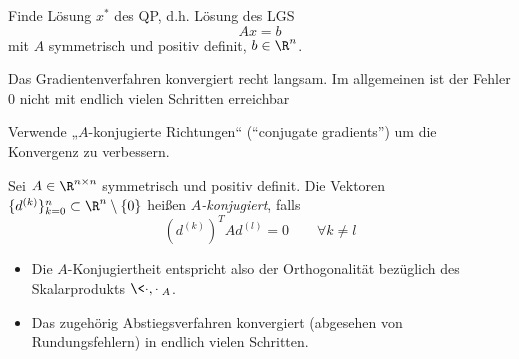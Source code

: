 \documentclass[11pt]{scrbook}
\begin{document}
Finde Lösung $x^*$ des QP, d.h. Lösung des LGS
\[
	Ax = b
\]
mit $A$ symmetrisch und positiv definit, $b \in \R^n$.

Das Gradientenverfahren konvergiert recht langsam.
Im allgemeinen ist der Fehler $0$ nicht mit endlich vielen Schritten erreichbar

Verwende „$A$-konjugierte Richtungen“ (“conjugate gradients”) um die Konvergenz zu verbessern.

\begin{df} \label{4.16}
	Sei $A \in \R^{n\times n}$ symmetrisch und positiv definit.
	Die Vektoren $\{d^{(k)}\}_{k=0}^n \subset \R^n \setminus \{0\}$ heißen \emph{$A$-konjugiert}, falls
	\[
		(d^{(k)})^T A d^{(l)} = 0
		\qquad 
		\forall k \neq l
	\]
	\begin{note}
		\begin{itemize}
			\item
				Die $A$-Konjugiertheit entspricht also der Orthogonalität bezüglich des Skalarprodukts $\<\cdot, \cdot\>_A$.
			\item
				Das zugehörig Abstiegsverfahren konvergiert (abgesehen von Rundungsfehlern) in endlich vielen Schritten.

		\end{itemize}
	\end{note}
\end{df}
\end{document}
